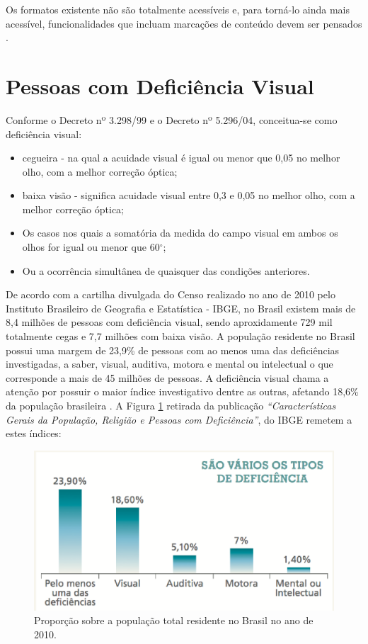 Os formatos existente não são totalmente acessíveis e, para torná-lo ainda mais acessível, funcionalidades que incluam marcações de conteúdo devem ser pensados \cite{challenge}.

\section{Pessoas com Deficiência Visual}

Conforme o Decreto nº 3.298/99 e o Decreto nº 5.296/04, conceitua-se como deficiência visual:

\begin{itemize}
	\item cegueira - na qual a acuidade visual é igual ou menor que 0,05 no melhor olho, com a melhor correção óptica;
	\item baixa visão - significa acuidade visual entre 0,3 e 0,05 no melhor olho, com a melhor correção óptica;
	\item Os casos nos quais a somatória da medida do campo visual em ambos os olhos for igual ou menor que 60$^{\circ}$;
	\item Ou a ocorrência simultânea de quaisquer das condições anteriores.
\end{itemize}

De acordo com a cartilha divulgada do Censo realizado no ano de 2010 pelo Instituto Brasileiro de Geografia e Estatística - IBGE, no Brasil existem mais de 8,4 milhões de pessoas com deficiência visual, sendo aproxidamente 729 mil totalmente cegas e 7,7 milhões com baixa visão. A população residente no Brasil possui uma margem de 23,9\% de pessoas com ao menos uma das deficiências investigadas, a saber, visual, auditiva, motora e mental ou intelectual o que corresponde a mais de 45 milhões de pessoas. A deficiência visual chama a atenção por possuir o maior índice investigativo dentre as outras, afetando 18,6\% da população brasileira \cite{cartilha}. A Figura \ref{censo2010} retirada da publicação \textit{``Características Gerais da População, Religião e Pessoas com Deficiência''}, do IBGE remetem a estes índices:

 \begin{figure}[ht]
	\centering
		\includegraphics[keepaspectratio=true,scale=0.9]{figuras/censo2010.eps}
	\caption{Proporção sobre a população total residente no Brasil no ano de 2010.}
	\label{censo2010}
\end{figure}

